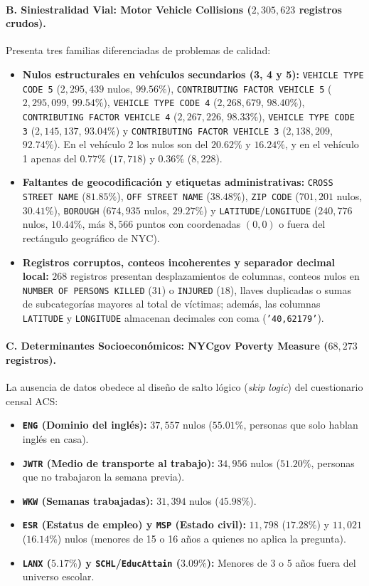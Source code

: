 \paragraph{B. Siniestralidad Vial: Motor Vehicle Collisions ($2,305,623$ registros crudos).}
Presenta tres familias diferenciadas de problemas de calidad:
\begin{itemize}
    \item \textbf{Nulos estructurales en vehículos secundarios (3, 4 y 5):} \texttt{VEHICLE TYPE CODE 5} ($2,295,439$ nulos, $99.56\%$), \texttt{CONTRIBUTING FACTOR VEHICLE 5} ($2,295,099$, $99.54\%$), \texttt{VEHICLE TYPE CODE 4} ($2,268,679$, $98.40\%$), \texttt{CONTRIBUTING FACTOR VEHICLE 4} ($2,267,226$, $98.33\%$), \texttt{VEHICLE TYPE CODE 3} ($2,145,137$, $93.04\%$) y \texttt{CONTRIBUTING FACTOR VEHICLE 3} ($2,138,209$, $92.74\%$). En el vehículo 2 los nulos son del $20.62\%$ y $16.24\%$, y en el vehículo 1 apenas del $0.77\%$ ($17,718$) y $0.36\%$ ($8,228$).
    \item \textbf{Faltantes de geocodificación y etiquetas administrativas:} \texttt{CROSS STREET NAME} ($81.85\%$), \texttt{OFF STREET NAME} ($38.48\%$), \texttt{ZIP CODE} ($701,201$ nulos, $30.41\%$), \texttt{BOROUGH} ($674,935$ nulos, $29.27\%$) y \texttt{LATITUDE}/\texttt{LONGITUDE} ($240,776$ nulos, $10.44\%$, más $8,566$ puntos con coordenadas $(0,0)$ o fuera del rectángulo geográfico de NYC).
    \item \textbf{Registros corruptos, conteos incoherentes y separador decimal local:} $268$ registros presentan desplazamientos de columnas, conteos nulos en \texttt{NUMBER OF PERSONS KILLED} ($31$) o \texttt{INJURED} ($18$), llaves duplicadas o sumas de subcategorías mayores al total de víctimas; además, las columnas \texttt{LATITUDE} y \texttt{LONGITUDE} almacenan decimales con coma (\texttt{'40,62179'}).
\end{itemize}

\paragraph{C. Determinantes Socioeconómicos: NYCgov Poverty Measure ($68,273$ registros).}
La ausencia de datos obedece al diseño de salto lógico (\textit{skip logic}) del cuestionario censal ACS:
\begin{itemize}
    \item \textbf{\texttt{ENG} (Dominio del inglés):} $37,557$ nulos ($55.01\%$, personas que solo hablan inglés en casa).
    \item \textbf{\texttt{JWTR} (Medio de transporte al trabajo):} $34,956$ nulos ($51.20\%$, personas que no trabajaron la semana previa).
    \item \textbf{\texttt{WKW} (Semanas trabajadas):} $31,394$ nulos ($45.98\%$).
    \item \textbf{\texttt{ESR} (Estatus de empleo) y \texttt{MSP} (Estado civil):} $11,798$ ($17.28\%$) y $11,021$ ($16.14\%$) nulos (menores de 15 o 16 años a quienes no aplica la pregunta).
    \item \textbf{\texttt{LANX} ($5.17\%$) y \texttt{SCHL}/\texttt{EducAttain} ($3.09\%$):} Menores de 3 o 5 años fuera del universo escolar.
\end{itemize}

